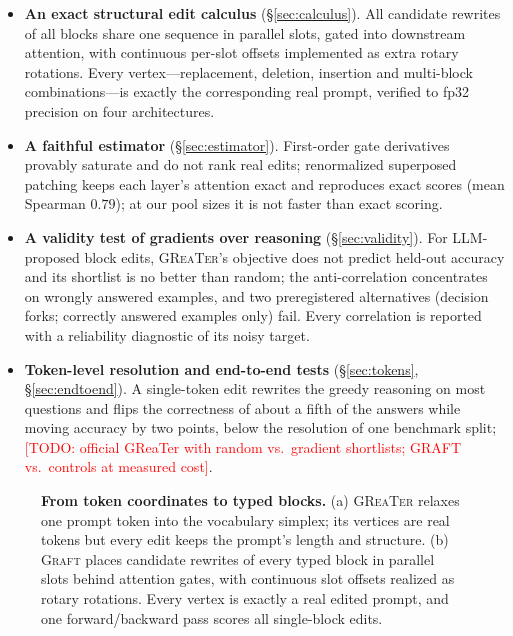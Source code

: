 \documentclass{article}
\newcommand{\graft}{\textsc{Graft}}
\newcommand{\greater}{\textsc{GReaTer}}
\newcommand{\todo}[1]{\textcolor{red}{[TODO: #1]}}
\begin{document}
\begin{itemize}
\item \textbf{An exact structural edit calculus} (\S\ref{sec:calculus}). All candidate
rewrites of all blocks share one sequence in parallel slots, gated into downstream
attention, with continuous per-slot offsets implemented as extra rotary rotations.
Every vertex---replacement, deletion, insertion and multi-block combinations---is
exactly the corresponding real prompt, verified to fp32 precision on four
architectures.
\item \textbf{A faithful estimator} (\S\ref{sec:estimator}). First-order gate derivatives
provably saturate and do not rank real edits; renormalized superposed patching keeps each
layer's attention exact and reproduces exact scores (mean Spearman $0.79$); at our pool
sizes it is not faster than exact scoring.
\item \textbf{A validity test of gradients over reasoning} (\S\ref{sec:validity}). For
LLM-proposed block edits, \greater{}'s objective does not predict held-out accuracy and
its shortlist is no better than random; the anti-correlation concentrates on wrongly
answered examples, and two preregistered alternatives (decision forks; correctly
answered examples only) fail. Every correlation is reported with a reliability
diagnostic of its noisy target.
\item \textbf{Token-level resolution and end-to-end tests} (\S\ref{sec:tokens},
\S\ref{sec:endtoend}). A single-token edit rewrites the greedy reasoning on most
questions and flips the correctness of about a fifth of the answers while moving accuracy
by two points, below the resolution of one benchmark
split; \todo{official GReaTer with random vs.\ gradient shortlists; GRAFT vs.\ controls at
measured cost}.
\end{itemize}

\begin{figure}[t]
\centering
\resizebox{\textwidth}{!}{}
\caption{\textbf{From token coordinates to typed blocks.} (a) \greater{} relaxes one
prompt token into the vocabulary simplex; its vertices are real tokens but every
edit keeps the prompt's length and structure. (b) \graft{} places candidate rewrites
of every typed block in parallel slots behind attention gates, with continuous
slot offsets realized as rotary rotations. Every vertex is exactly a real edited
prompt, and one forward/backward pass scores all single-block edits.}
\label{fig:overview}
\end{figure}
\end{document}
